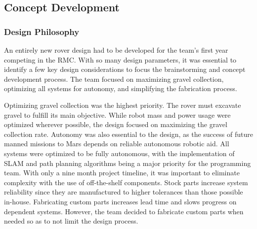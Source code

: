 \documentclass[class=article, crop=false]{standalone}
\begin{document}
	\subsection{Concept Development}
	\label{subsec:concept_development}
	\subsubsection{Design Philosophy}
	An entirely new rover design had to be developed for the team's first year competing in the RMC. With so many design parameters, it was essential to identify a few key design considerations to focus the brainstorming and concept development process. The team focused on maximizing gravel collection, optimizing all systems for autonomy, and simplifying the fabrication process.
	
	
Optimizing gravel collection was the highest priority. The rover must excavate gravel to fulfill its main objective. While robot mass and power usage were optimized wherever possible, the design focused on maximizing the gravel collection rate. Autonomy was also essential to the design, as the success of future manned missions to Mars depends on reliable autonomous robotic aid. All systems were optimized to be fully autonomous, with the implementation of SLAM and path planning algorithms being a major priority for the programming team. With only a nine month project timeline, it was important to eliminate complexity with the use of off-the-shelf components. Stock parts increase system reliability since they are manufactured to higher tolerances than those possible in-house. Fabricating custom parts increases lead time and slows progress on dependent systems. However, the team decided to fabricate custom parts when needed so as to not limit the design process.
\end{document}

